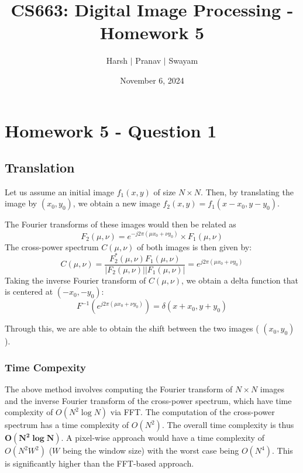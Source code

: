 \documentclass{article}
\title{CS663: Digital Image Processing - Homework 5}
\author{Harsh $\vert$ Pranav $\vert$ Swayam}
\date{November 6, 2024}
\begin{document}
\maketitle
\flushleft
\section*{Homework 5 - Question 1}


\subsection*{Translation}
Let us assume an initial image $f_1(x, y)$ of size $N \times N$. Then, by translating the image by $(x_0, y_0)$, we obtain a new image $f_2(x, y) = f_1(x - x_0, y - y_0)$. 

The Fourier transforms of these images would then be related as
\[
    F_2(\mu, \nu) = e^{-j 2 \pi (\mu x_0 + \nu y_0)} \times F_1(\mu, \nu)
\]
The cross-power spectrum $C(\mu, \nu)$ of both images is then given by:
\[
    C(\mu, \nu) = \frac{F_2^*(\mu, \nu) F_1(\mu, \nu)}{|F_2(\mu, \nu)||F_1(\mu, \nu)|} = e^{j 2 \pi (\mu x_0 + \nu y_0)}
\]
Taking the inverse Fourier transform of $C(\mu, \nu)$, we obtain a delta function that is centered at $(-x_0, -y_0)$:
\[
    F^{-1} \left( e^{j 2 \pi (\mu x_0 + \nu y_0)} \right) = \delta(x + x_0, y + y_0)
\]

Through this, we are able to obtain the shift between the two images ( $(x_0, y_0)$).

\subsubsection*{Time Compexity}
The above method involves computing the Fourier transform of $N \times N$ images and the inverse Fourier transform of the cross-power spectrum,
 which have time complexity of $O(N^2 \log N)$ via FFT.
 The computation of the cross-power spectrum has a time complexity of $O(N^2)$.
\newline
\newline
The overall time complexity is thus \(\mathbf{O(N^2 \log N)}\).
\newline
\newline
A pixel-wise approach would have a time complexity of \(O(N^2W^2)\) (\(W\) being the window size) with the worst case being \(O(N^4)\).
This is significantly higher than the FFT-based approach.
\pagebreak
\end{document}
